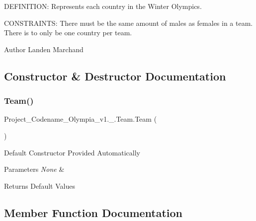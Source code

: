 D\+E\+F\+I\+N\+I\+T\+I\+ON\+: Represents each country in the Winter Olympics.

C\+O\+N\+S\+T\+R\+A\+I\+N\+TS\+: There must be the same amount of males as females in a team. There is to only be one country per team.\begin{DoxyAuthor}{Author}
Landen Marchand 
\end{DoxyAuthor}


\subsection{Constructor \& Destructor Documentation}
\mbox{\label{classProject__Codename__Olympia__v1_1_1__0_1_1Team_a370f46a59abab44451339138a0bf56aa}} 
\subsubsection{\texorpdfstring{Team()}{Team()}}
{\footnotesize\ttfamily Project\+\_\+\+Codename\+\_\+\+Olympia\+\_\+v1.\+\_.\+Team.\+Team (\begin{DoxyParamCaption}{ }\end{DoxyParamCaption})\hspace{0.3cm}{\ttfamily [inline]}}

Default Constructor Provided Automatically 
\begin{DoxyParams}{Parameters}
{\em None} & \\
\hline
\end{DoxyParams}
\begin{DoxyReturn}{Returns}
Default Values 
\end{DoxyReturn}


\subsection{Member Function Documentation}
\mbox{\label{classProject__Codename__Olympia__v1_1_1__0_1_1Team_a2f6a8ccddb47c40e497252321bcda811}} 
